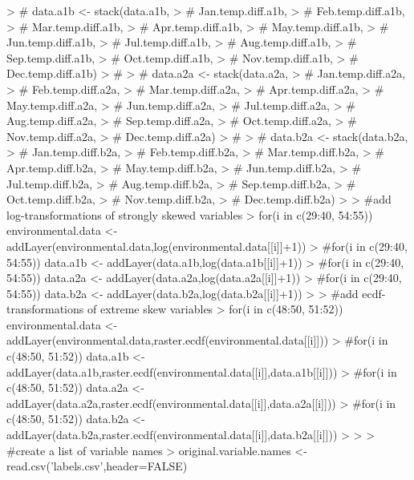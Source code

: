\documentclass[10pt]{article}
\renewenvironment{Schunk}{\vspace{\topsep}}{\vspace{\topsep}}
\begin{document}
\begin{Schunk}
\begin{Sinput}
> # data.a1b <- stack(data.a1b,
> #                   Jan.temp.diff.a1b,
> #                   Feb.temp.diff.a1b,
> #                   Mar.temp.diff.a1b,
> #                   Apr.temp.diff.a1b,
> #                   May.temp.diff.a1b,
> #                   Jun.temp.diff.a1b,
> #                   Jul.temp.diff.a1b,
> #                   Aug.temp.diff.a1b,
> #                   Sep.temp.diff.a1b,
> #                   Oct.temp.diff.a1b,
> #                   Nov.temp.diff.a1b,
> #                   Dec.temp.diff.a1b)
> # 
> # data.a2a <- stack(data.a2a,
> #                   Jan.temp.diff.a2a,
> #                   Feb.temp.diff.a2a,
> #                   Mar.temp.diff.a2a,
> #                   Apr.temp.diff.a2a,
> #                   May.temp.diff.a2a,
> #                   Jun.temp.diff.a2a,
> #                   Jul.temp.diff.a2a,
> #                   Aug.temp.diff.a2a,
> #                   Sep.temp.diff.a2a,
> #                   Oct.temp.diff.a2a,
> #                   Nov.temp.diff.a2a,
> #                   Dec.temp.diff.a2a)
> # 
> # data.b2a <- stack(data.b2a,
> #                   Jan.temp.diff.b2a,
> #                   Feb.temp.diff.b2a,
> #                   Mar.temp.diff.b2a,
> #                   Apr.temp.diff.b2a,
> #                   May.temp.diff.b2a,
> #                   Jun.temp.diff.b2a,
> #                   Jul.temp.diff.b2a,
> #                   Aug.temp.diff.b2a,
> #                   Sep.temp.diff.b2a,
> #                   Oct.temp.diff.b2a,
> #                   Nov.temp.diff.b2a,
> #                   Dec.temp.diff.b2a)
> 
> #add log-transformations of strongly skewed variables
> for(i in c(29:40, 54:55)) environmental.data <- addLayer(environmental.data,log(environmental.data[[i]]+1))
> #for(i in c(29:40, 54:55)) data.a1b <- addLayer(data.a1b,log(data.a1b[[i]]+1))
> #for(i in c(29:40, 54:55)) data.a2a <- addLayer(data.a2a,log(data.a2a[[i]]+1))
> #for(i in c(29:40, 54:55)) data.b2a <- addLayer(data.b2a,log(data.b2a[[i]]+1))
> 
> #add ecdf-transformations of extreme skew variables
> for(i in c(48:50, 51:52)) environmental.data <- addLayer(environmental.data,raster.ecdf(environmental.data[[i]]))
> #for(i in c(48:50, 51:52)) data.a1b <- addLayer(data.a1b,raster.ecdf(environmental.data[[i]],data.a1b[[i]]))
> #for(i in c(48:50, 51:52)) data.a2a <- addLayer(data.a2a,raster.ecdf(environmental.data[[i]],data.a2a[[i]]))
> #for(i in c(48:50, 51:52)) data.b2a <- addLayer(data.b2a,raster.ecdf(environmental.data[[i]],data.b2a[[i]]))
> 
> 
> #create a list of variable names
> original.variable.names <- read.csv('labels.csv',header=FALSE)

\end{Sinput}
\end{Schunk}
\end{document}
